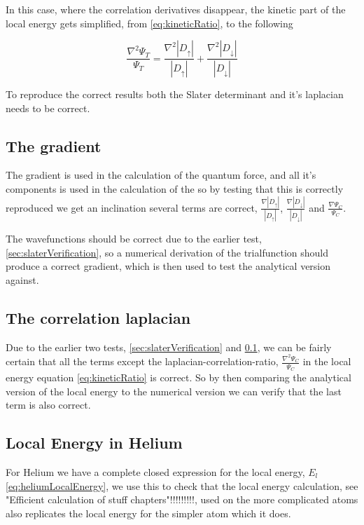 			In this case, where the correlation derivatives disappear, the kinetic part of the local energy gets simplified, from \eqref{eq:kineticRatio}, to the following

			\[\frac{\nabla^2 \Psi_T}{\Psi_T} = \frac{\nabla^2 |D_\uparrow|}{|D_\uparrow|} + \frac{\nabla^2 |D_\downarrow|}{|D_\downarrow|}  \]

			To reproduce the correct results both the Slater determinant and it's laplacian needs to be correct.

		\subsection{The gradient}
			\label{sec:gradientVerification}
			The gradient is used in the calculation of the quantum force, and all it's components is used in the calculation of the so by testing that this is correctly reproduced we get an inclination several terms are correct, \(\frac{\nabla |D_\uparrow|}{|D_\uparrow|} \), \( \frac{\nabla |D_\downarrow|}{|D_\downarrow|} \) and \( \frac{\nabla \Psi_C}{\Psi_C} \).

			The wavefunctions should be correct due to the earlier test, \ref{sec:slaterVerification}, so a numerical derivation of the trialfunction should produce a correct gradient, which is then used to test the analytical version against.



		\subsection{The correlation laplacian}
			\label{sec:laplacianCorrelationVerification}

			Due to the earlier two tests, \ref{sec:slaterVerification} and \ref{sec:gradientVerification}, we can be fairly certain that all the terms except the laplacian-correlation-ratio, \(\frac{\nabla^2\Psi_C}{\Psi_C}\) in the local energy equation \eqref{eq:kineticRatio} is correct. So by then comparing the analytical version of the local energy to the numerical version we can verify that the last term is also correct.

		\subsection{Local Energy in Helium}
			For Helium we have a complete closed expression for the local energy, \(E_l\) \eqref{eq:heliumLocalEnergy}, we use this to check that the local energy calculation, see "Efficient calculation of stuff chapters"!!!!!!!!!, used on the more complicated atoms  also replicates the local energy for the simpler atom which it does. 


